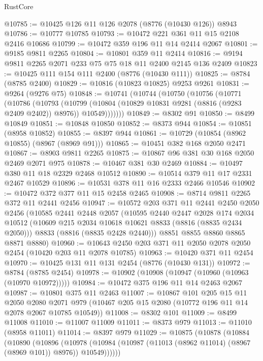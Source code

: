 \begin{lexlean}{RustCore}
\begin{coremodule}
@10785 := @10425 @126 @11 @126 @2078 (@8776 (@10430 @126)) @8943
@10786 := @10777 @10785
@10793 := @10472 @221 @361 @11 @15 @2108 @2416 @10686
@10799 := @10472 @359 @196 @11 @14 @2414 @2067
@10801 := @9185 @9811 @2265
@10804 := @10801 @359 @11 @2414
@10816 := @9194 @9811 @2265 @2071 @233 @75 @75 @18 @11 @2400 @2145 @136 @2409
@10823 := @10425 @111 @154 @111 @2400 (@8776 (@10430 @111))
@10825 := @8784 (@8785 @2400)
@10829 := @10816 (@10823 @10825) @9253 @9261
@10831 := @9264 (@9276 @75)
@10848 := @10741
    (@10744
      (@10750
        (@10756
          (@10771
            (@10786
              (@10793
                (@10799
                  (@10804 (@10829 @10831 @9281 (@8816 (@9283 @2409 @2402)) @8976))
                  @10549)))))))
@10849 := @8302 @91
@10850 := @8499 @10849
@10851 := @10848 @10850
@10852 := @8373 @944
@10854 := @10851 (@8958 @10852)
@10855 := @8397 @944
@10861 := @10729 (@10854 (@8962 @10855) (@8967 (@8969 @91)))
@10865 := @10451 @382 @168 @2050 @2471
@10867 := @8903 @9811 @2265
@10875 := @10867 @96 @381 @30 @168 @2050 @2469 @2071 @975
@10878 := @10467 @381 @30 @2469
@10884 := @10497 @380 @11 @18 @2329 @2468 @10512
@10890 := @10514 @379 @11 @17 @2331 @2467 @10529
@10896 := @10531 @378 @11 @16 @2333 @2466 @10546
@10902 := @10472 @372 @377 @11 @15 @2458 @2465
@10908 := @8714 @9811 @2265 @372 @11 @2441 @2456
@10947 := @10572
    @203
    @371
    @11
    @2441
    @2450
    @2050
    @2456
    (@10585
      @2441
      @2448
      @2057
      (@10595
        @2440
        @2447
        @2028
        @174
        @2034
        @10512
        (@10609 @215 @2034 @10618 @10621 @8833 (@8816 (@8835 @2434 @2050)))
        @8833
        (@8816 (@8835 @2428 @2440)))
      @8851
      @8855
      @8860
      @8865
      @8871
      @8880)
@10960 := @10643 @2450 @203 @371 @11 @2050 @2078 @2050 @2454 (@10420 @203 @11 @2078 @10785)
@10963 := @10420 @371 @11 @2454
@10970 := @10425 @131 @11 @131 @2454 (@8776 (@10430 @131))
@10972 := @8784 (@8785 @2454)
@10978 := @10902 (@10908 (@10947 (@10960 (@10963 (@10970 @10972)))))
@10984 := @10472 @375 @196 @11 @14 @2463 @2067
@10987 := @10801 @375 @11 @2463
@11007 := @10867
    @101
    @205
    @15
    @11
    @2050
    @2080
    @2071
    @979
    (@10467 @205 @15 @2080 (@10772 @196 @11 @14 @2078 @2067 @10785 @10549))
@11008 := @8302 @101
@11009 := @8499 @11008
@11010 := @11007 @11009
@11011 := @8373 @979
@11013 := @11010 (@8958 @11011)
@11014 := @8397 @979
@11029 := @10875
    (@10878
      (@10884
        (@10890
          (@10896
            (@10978 (@10984 (@10987 (@11013 (@8962 @11014) (@8967 (@8969 @101)) @8976)) @10549))))))

\end{coremodule}
\end{lexlean}
